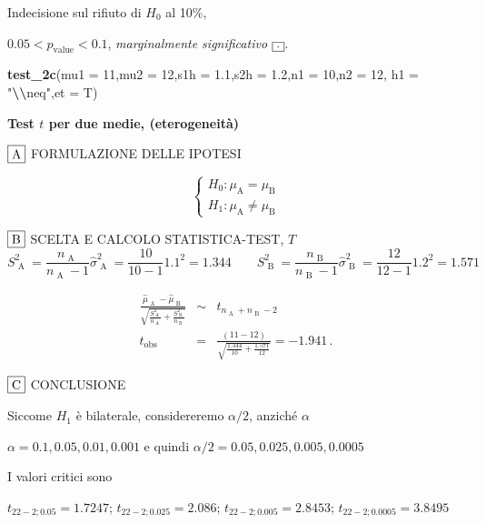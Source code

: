 \documentclass[
  11pt,
]{book}
\newenvironment{Shaded}{\begin{snugshade}}{\end{snugshade}}
\newcommand{\AttributeTok}[1]{\textcolor[rgb]{0.13,0.29,0.53}{#1}}
\newcommand{\DecValTok}[1]{\textcolor[rgb]{0.00,0.00,0.81}{#1}}
\newcommand{\FloatTok}[1]{\textcolor[rgb]{0.00,0.00,0.81}{#1}}
\newcommand{\FunctionTok}[1]{\textcolor[rgb]{0.13,0.29,0.53}{\textbf{#1}}}
\newcommand{\NormalTok}[1]{#1}
\newcommand{\SpecialCharTok}[1]{\textcolor[rgb]{0.81,0.36,0.00}{\textbf{#1}}}
\newcommand{\StringTok}[1]{\textcolor[rgb]{0.31,0.60,0.02}{#1}}
\theoremstyle{mytheoremstyle}
\theoremstyle{mydefstyle}
\begin{document}
Indecisione sul rifiuto di \(H_0\) al 10\%,

\(0.05<p_\text{value}<0.1\), \emph{marginalmente significativo} \(\fbox{.}\).

\begin{Shaded}
\begin{Highlighting}[]
\FunctionTok{test\_2c}\NormalTok{(}\AttributeTok{mu1 =} \DecValTok{11}\NormalTok{,}\AttributeTok{mu2 =} \DecValTok{12}\NormalTok{,}\AttributeTok{s1h =} \FloatTok{1.1}\NormalTok{,}\AttributeTok{s2h =} \FloatTok{1.2}\NormalTok{,}\AttributeTok{n1 =} \DecValTok{10}\NormalTok{,}\AttributeTok{n2 =} \DecValTok{12}\NormalTok{,}
            \AttributeTok{h1 =} \StringTok{"}\SpecialCharTok{\textbackslash{}\textbackslash{}}\StringTok{neq"}\NormalTok{,}\AttributeTok{et =}\NormalTok{ T)}
\end{Highlighting}
\end{Shaded}

\textbf{Test \(t\) per due medie, (eterogeneità)}

\(\fbox{A}\) FORMULAZIONE DELLE IPOTESI

\[\begin{cases}
   H_0: \mu_\text{A} = \mu_\text{B} \\
   H_1: \mu_\text{A} \neq \mu_\text{B} 
   \end{cases}\]

\(\fbox{B}\) SCELTA E CALCOLO STATISTICA-TEST, \(T\)
\[
     S^2_\text{ A }=\frac{n_\text{ A }}{n_\text{ A }-1}\hat\sigma^2_\text{ A }=\frac{ 10 }{ 10 -1} 1.1 ^2= 1.344  \qquad
     S^2_\text{ B }=\frac{n_\text{ B }}{n_\text{ B }-1}\hat\sigma^2_\text{ B }=\frac{ 12 }{ 12 -1} 1.2 ^2= 1.571 
   \]

\begin{eqnarray*}
   \frac{\hat\mu_\text{ A } - \hat\mu_\text{ B }}
   {\sqrt{\frac {S^2_\text{ A }}{n_\text{ A }}+\frac {S^2_\text{ B }}{n_\text{ B }}}}&\sim&t_{n_\text{ A }+n_\text{ B }-2}\\
   t_{\text{obs}}
   &=& \frac{ ( 11 -  12 )} {\sqrt{\frac{ 1.344 }{ 10 }+\frac{ 1.571 }{ 12 }}}
   =   -1.941 \, .
   \end{eqnarray*}

\(\fbox{C}\) CONCLUSIONE

Siccome \(H_1\) è bilaterale, considereremo \(\alpha/2\),
anziché \(\alpha\)

\(\alpha=0.1, 0.05, 0.01, 0.001\) e quindi \(\alpha/2=0.05, 0.025, 0.005, 0.0005\)

I valori critici sono

\(t_{22-2;0.05}=1.7247\); \(t_{22-2;0.025}=2.086\); \(t_{22-2;0.005}=2.8453\); \(t_{22-2;0.0005}=3.8495\)
\end{document}
